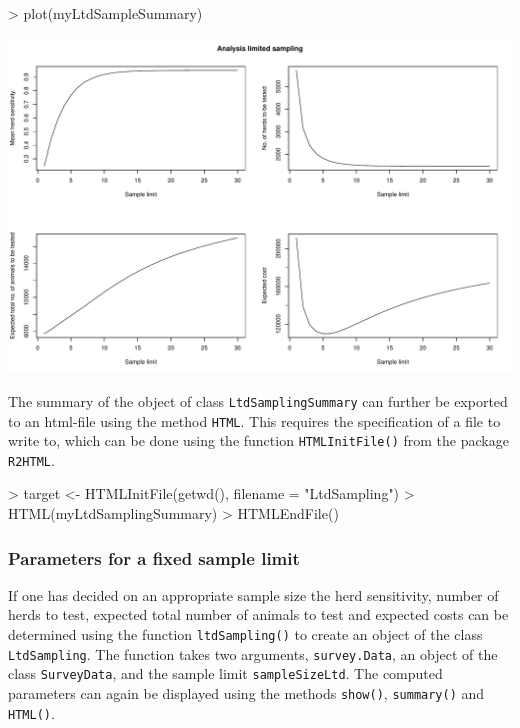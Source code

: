 \documentclass[nojss]{jss}
\begin{document}
\begin{Schunk}
\begin{Sinput}
> plot(myLtdSampleSummary)  
\end{Sinput}
\end{Schunk}
\includegraphics{FFD-intro-007}

The summary of the object of class \texttt{LtdSamplingSummary} can 
further be exported to an html-file using the method \texttt{HTML}. 
 This requires the 
specification of a file to write to, which can be done using the 
function \texttt{HTMLInitFile()} from the package \texttt{R2HTML}. 

\begin{Schunk}
\begin{Sinput}
> target <- HTMLInitFile(getwd(), filename = "LtdSampling")
> HTML(myLtdSamplingSummary)
> HTMLEndFile()
\end{Sinput}
\end{Schunk} 

\subsubsection{Parameters for a fixed sample limit}

If one has decided on an appropriate sample size the herd 
sensitivity, number of herds to test, expected total number of 
animals to test and expected costs can be determined using the 
function \texttt{ltdSampling()}  to 
create an object of the class \texttt{LtdSampling}. 
  The 
function takes two arguments, \texttt{survey.Data}, an object of the 
class \texttt{SurveyData}, and the sample limit 
\texttt{sampleSizeLtd}. The computed parameters can again be 
displayed using the methods \texttt{show()}, \texttt{summary()} and 
\texttt{HTML()}.  
\end{document}
